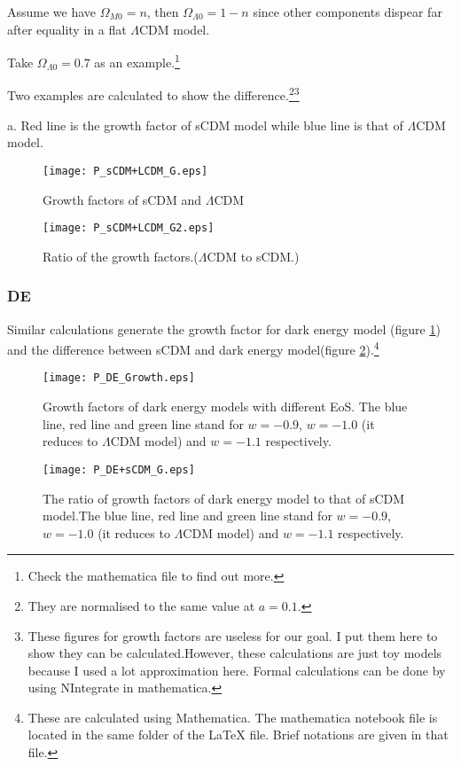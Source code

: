 \documentclass{article}
\begin{document}
Assume we have $\Omega_{M0}=n$, then $\Omega_{\Lambda 0}=1-n$ since other components dispear far after equality in a flat $\Lambda$CDM model.

Take $\Omega_{\Lambda 0}=0.7$ as an example.{\footnote{
Check the mathematica file to find out more.
}}



Two examples are calculated to show the difference.{\footnote{
They are normalised to the same value at $a=0.1$.
}}{\footnote{{\color{blue}These figures for growth factors are useless for our goal. I put them here to show they can be calculated.}{\color{red}However, these calculations are just toy models because I used a lot approximation here. Formal calculations can be done by using NIntegrate in mathematica.}}}

a. Red line is the growth factor of sCDM model while blue line is that of $\Lambda$CDM model.


\begin{figure}[h]

\centering
\texttt{[image: P\_sCDM+LCDM\_G.eps]}
\caption{Growth factors of sCDM and $\Lambda$CDM}
\end{figure}

\begin{figure}
\centering
\texttt{[image: P\_sCDM+LCDM\_G2.eps]}
\caption{Ratio of the growth factors.($\Lambda$CDM to sCDM.)}
\end{figure}




\subsubsection{DE}

Similar calculations generate the growth factor for dark energy model (figure \ref{DE_G}) and the difference between sCDM and dark energy model(figure \ref{DE+sCDM_G}).{\footnote{{\color{red}
These are calculated using Mathematica. The mathematica notebook file is located in the same folder of the {\LaTeX} file. Brief notations are given in that file.
}}}

\begin{figure}[h]
\centering
\texttt{[image: P\_DE\_Growth.eps]}
\caption{Growth factors of dark energy models with different EoS. The blue line,  red line and green line stand for $w=-0.9$, $w=-1.0$ (it reduces to $\Lambda$CDM model) and $w=-1.1$ respectively.} \label{DE_G}
\end{figure}

\begin{figure}[h]
\centering
\texttt{[image: P\_DE+sCDM\_G.eps]}
\caption{The ratio of growth factors of dark energy model to that of sCDM model.The blue line,  red line and green line stand for $w=-0.9$, $w=-1.0$ (it reduces to $\Lambda$CDM model) and $w=-1.1$ respectively. }\label{DE+sCDM_G}
\end{figure}
\end{document}
